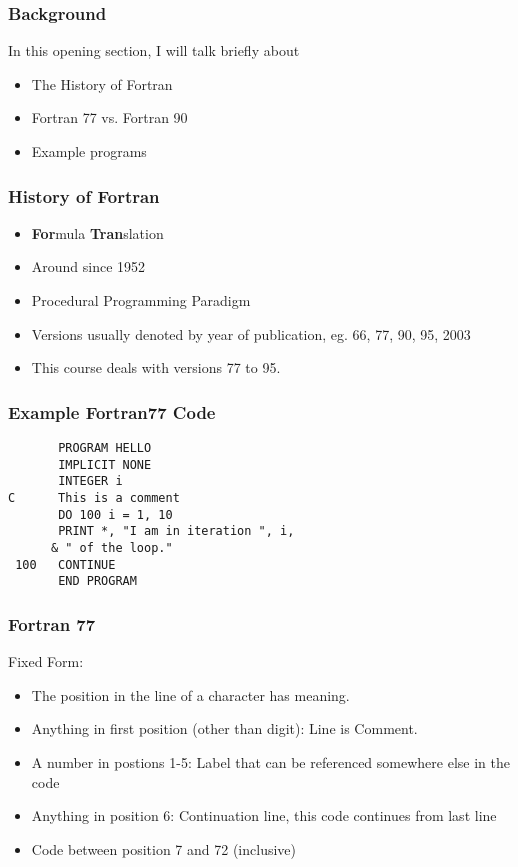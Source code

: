 \begin{frame}
  \frametitle{Background}
  In this opening section, I will talk briefly about
  \begin{itemize}
    \item The History of Fortran
    \item Fortran 77 vs. Fortran 90
    \item Example programs
  \end{itemize}
\end{frame}

\begin{frame}
  \frametitle{History of Fortran}
  \begin{itemize}
    \item \textbf{For}mula \textbf{Tran}slation
    \item Around since 1952
    \item Procedural Programming Paradigm
    \item Versions usually denoted by year of publication, eg. 66, 77, 90, 95, 2003
    \item This course deals with versions 77 to 95.
  \end{itemize}
\end{frame}

\begin{frame}[fragile]
  \frametitle{Example Fortran77 Code}
  \begin{lstlisting}
       PROGRAM HELLO
       IMPLICIT NONE
       INTEGER i
C      This is a comment
       DO 100 i = 1, 10
       PRINT *, "I am in iteration ", i,
      & " of the loop."
 100   CONTINUE
       END PROGRAM
  \end{lstlisting}
\end{frame}

\begin{frame}
  \frametitle{Fortran 77}
  Fixed Form:
  \begin{itemize}
       \item The position in the line of a character has meaning.
       \item Anything in first position (other than digit): 
             Line is Comment.
       \item A number in postions 1-5: 
             Label that can be referenced somewhere else in the code
       \item Anything in position 6:
             Continuation line, this code continues from last line
       \item Code between position 7 and 72 (inclusive)
  \end{itemize}
\end{frame}


